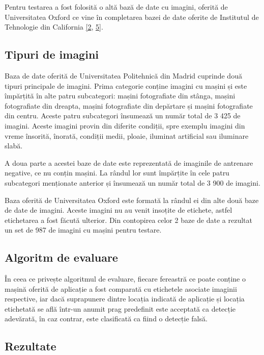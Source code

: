 Pentru testarea a fost folosită o altă bază de date cu imagini, oferită de Universitatea Oxford ce vine în completarea bazei de date oferite de Institutul de Tehnologie din California \hyperlink{BazadedatemasiniUniversitateaOxford}{[2}, \hyperlink{BazadedatemasiniInstituluideTehnologiedinCalifornia}{5]}.

\subsection*{Tipuri de imagini}

Baza de date oferită de Universitatea Politehnică din Madrid cuprinde două tipuri principale de imagini. Prima categorie conține imagini cu mașini și este împărțită în alte patru subcategori: mașini fotografiate din stânga, mașini fotografiate din dreapta, mașini fotografiate din depărtare și mașini fotografiate din centru. Aceste patru subcategori însumează un număr total de 3 425 de imagini. Aceste imagini provin din diferite condiții, spre exemplu imagini din vreme însorită, înorată, condiții medii, ploaie, iluminat artificial sau iluminare slabă.

A doua parte a acestei baze de date este reprezentată de imaginile de antrenare negative, ce nu conțin mașini. La rândul lor sunt împărțite în cele patru subcategori menționate anterior și însumează un număr total de 3 900 de imagini.

Baza oferită de Universitatea Oxford este formată la rândul ei din alte două baze de date de imagini. Aceste imagini nu au venit insoțite de etichete, astfel etichetarea a fost făcută ulterior. Din contopirea celor 2 baze de date a rezultat un set de 987 de imagini cu mașini pentru testare.

\subsection*{Algoritm de evaluare}

În ceea ce privește algoritmul de evaluare, fiecare fereastră ce poate conține o mașină oferită de aplicație a fost comparată cu etichetele asociate imaginii respective, iar dacă suprapunere dintre locația indicată de aplicație și locația etichetată se află într-un anumit prag predefinit este acceptată ca detecție adevărată, în caz contrar, este clasificată ca fiind o detecție falsă.

\subsection*{Rezultate}

